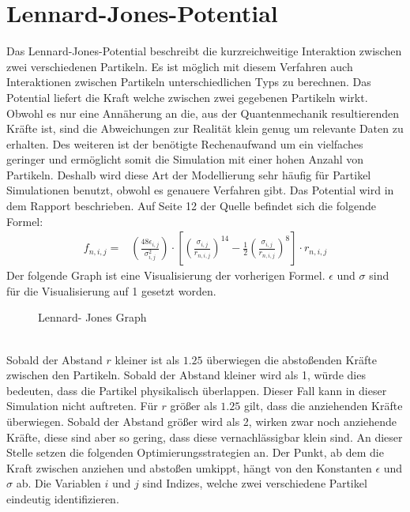 \documentclass[
12pt,
a4paper,
BCOR10mm,
DIV14,
headsepline,
]{scrreprt}
\begin{document}
	\section{Lennard-Jones-Potential}%
	Das Lennard-Jones-Potential beschreibt die kurzreichweitige Interaktion zwischen zwei verschiedenen Partikeln. Es ist möglich mit diesem Verfahren auch Interaktionen zwischen Partikeln unterschiedlichen Typs zu berechnen. Das Potential liefert die Kraft welche zwischen zwei gegebenen Partikeln wirkt. Obwohl es nur eine Annäherung an die, aus der Quantenmechanik resultierenden Kräfte ist, sind die Abweichungen zur Realität klein genug um relevante Daten zu erhalten. Des weiteren ist der benötigte Rechenaufwand um ein vielfaches geringer und ermöglicht somit die Simulation mit einer hohen Anzahl von Partikeln. Deshalb wird diese Art der Modellierung sehr häufig für Partikel Simulationen benutzt, obwohl es genauere Verfahren gibt. Das Potential wird in dem Rapport \cite{DCRapaport} beschrieben. Auf Seite 12 der Quelle \cite{DCRapaport} befindet sich die folgende Formel:
	\begin{align*}
	f_{n,i,j}=&\left(\frac{48\epsilon_{i,j}}{\sigma_{i,j}^2}\right)\cdot\left[\left(\frac{\sigma_{i,j}}{r_{n,i,j}}\right)^{14}-\frac{1}{2}\left(\frac{\sigma_{i,j}}{r_{n,i,j}}\right)^8\right]\cdot r_{n,i,j}
	\end{align*}
	Der folgende Graph ist eine Visualisierung der vorherigen Formel. $\epsilon$ und $\sigma$ sind für die Visualisierung auf 1 gesetzt worden.
	\begin{figure}[h]
		\centering
		\caption{Lennard- Jones Graph}
		\label{figure:LennardJonesGraph}
	\end{figure}\\
	Sobald der Abstand $r$ kleiner ist als $1.25$ überwiegen die abstoßenden Kräfte zwischen den Partikeln. Sobald der Abstand kleiner wird als 1, würde dies bedeuten, dass die Partikel physikalisch überlappen. Dieser Fall kann in dieser Simulation nicht auftreten. Für $r$ größer als $1.25$ gilt, dass die anziehenden Kräfte überwiegen. Sobald der Abstand größer wird als 2, wirken zwar noch anziehende Kräfte, diese sind aber so gering, dass diese vernachlässigbar klein sind. An dieser Stelle setzen die folgenden Optimierungsstrategien an. Der Punkt, ab dem die Kraft zwischen anziehen und abstoßen umkippt, hängt von den Konstanten $\epsilon$ und $\sigma$ ab. Die Variablen $i$ und $j$ sind Indizes, welche zwei verschiedene Partikel eindeutig identifizieren.
\end{document}
